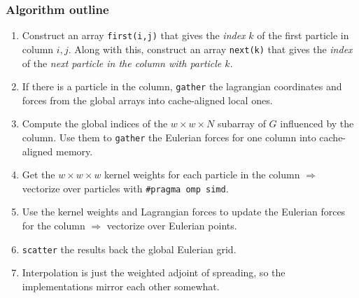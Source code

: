 \documentclass[10pt]{beamer}
\begin{document}
\begin{frame}
\frametitle{Algorithm outline}
\begin{enumerate}[1]
	\item Construct an array \texttt{first(i,j)} that gives the \emph{index} $k$ of the first particle in column $i,j$. Along with this, construct an array \texttt{next(k)} that gives the \emph{index} of the \emph{next particle in the column with particle $k$}.
	\item If there is a particle in the column, \texttt{gather} the lagrangian coordinates and forces from the global arrays into cache-aligned local ones.
	\item Compute the global indices of the $w \times w \times N$ subarray of $G$ influenced by the column. Use them to \texttt{gather} the Eulerian forces for one column into cache-aligned memory.
	\item Get the $w \times w \times w$ kernel weights for each particle in the column $\Rightarrow$ vectorize over particles with \texttt{\#pragma omp simd}.
	\item Use the kernel weights and Lagrangian forces to update the Eulerian forces for the column $\Rightarrow$ vectorize over Eulerian points. 
	\item \texttt{scatter} the results back the global Eulerian grid. 
	\item Interpolation is just the weighted adjoint of spreading, so the implementations mirror each other somewhat.
\end{enumerate}
\end{frame}
\end{document}
